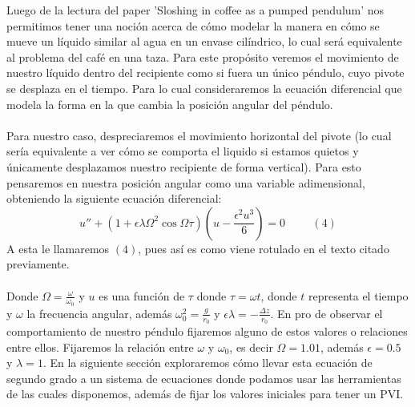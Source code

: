 \documentclass{article}
\begin{document}
Luego de la lectura del paper 'Sloshing in coffee as a pumped pendulum' nos permitimos tener una noción acerca de cómo modelar la manera en cómo se mueve un líquido similar al agua en un envase cilíndrico, lo cual será equivalente al problema del café en una taza. Para este propósito veremos el movimiento de nuestro líquido dentro del recipiente como si fuera un único péndulo, cuyo pivote se desplaza en el tiempo. Para lo cual consideraremos la ecuación diferencial que modela la forma en la que cambia la posición angular del péndulo.\\
\\
Para nuestro caso, despreciaremos el movimiento horizontal del pivote (lo cual sería equivalente a ver cómo se comporta el liquido si estamos quietos y únicamente desplazamos nuestro recipiente de forma vertical). Para esto pensaremos en nuestra posición angular como una variable adimensional, obteniendo la siguiente ecuación diferencial:
\[
u''+(1+\epsilon\lambda\Omega^{2}\cos{\Omega\tau})(u-\frac{\epsilon^2u^3}{6})=0 \hspace{1cm}(4)
\]
A esta le llamaremos $(4)$, pues así es como viene rotulado en el texto citado previamente.\\
\\
Donde $\Omega=\frac{\omega}{\omega_0}$ y $u$ es una función de $\tau$ donde $\tau=\omega t$, donde $t$ representa el tiempo y $\omega$ la frecuencia angular, además $\omega^2_0=\frac{g}{r_0}$ y $\epsilon\lambda=-\frac{\Delta z}{r_0}$. En pro de observar el comportamiento de nuestro péndulo fijaremos alguno de estos valores o relaciones entre ellos. Fijaremos la relación entre $\omega$ y $\omega_0$, es decir $\Omega=1.01$, además $\epsilon=0.5$ y $\lambda=1$. En la siguiente sección exploraremos cómo llevar esta ecuación de segundo grado a un sistema de ecuaciones donde podamos usar las herramientas de las cuales disponemos, además de fijar los valores iniciales para tener un PVI.
\end{document}

